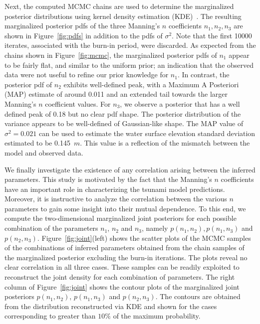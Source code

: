 Next, the computed MCMC chains are used to determine the marginalized posterior 
distributions using kernel density estimation (KDE)~\citep{Parzen1962,Silverman1986}.  
The resulting marginalized posterior pdfs of the three Manning's $n$ coefficients 
$n_1,n_2,n_3$ are shown in Figure~\ref{fig:pdfs} in addition to the pdfs of $\sigma^2$. 
Note that the first 10000 iterates, associated with the burn-in period, were discarded.  
As expected from the chains shown in Figure~\ref{fig:mcmc}, the marginalized posterior 
pdfs of $n_1$ appear to be fairly flat, and similar to the uniform prior; an indication 
that the observed data were not useful to refine our prior knowledge for $n_1$. In 
contrast, the posterior pdf of $n_2$ exhibits well-defined peak, with a Maximum A 
Posteriori (MAP) estimate of around 0.011 and an extended tail towards the larger 
Manning's $n$ coefficient values. For $n_3$, we observe a posterior that has a well 
defined peak of 0.18 but no clear pdf shape. The posterior distribution of the variance 
appears to be well-defined of Gaussian-like shape. The MAP value of $\sigma^2=0.021$ 
can be used to estimate the water surface elevation standard deviation estimated to 
be 0.145~$m$. This value is a reflection of the mismatch between the model and 
observed data.

We finally investigate the existence of any correlation arising between the inferred parameters.
This study is motivated by the fact that the Manning's $n$ coefficients have an important role 
in characterizing the tsunami model predictions. Moreover, it is instructive to analyze the 
correlation between the various $n$ parameters to gain some insight into their mutual dependence.
To this end, we compute the two-dimensional marginalized joint posteriors for each 
possible combination of the parameters $n_1$, $n_2$ and $n_3$, namely $p(n_1, n_2), p(n_1, n_3)$ and $p(n_2, n_3)$. 
Figure~\ref{fig:joint}(left) shows the scatter plots of the MCMC samples of the combinations of 
inferred parameters obtained from the chain samples of the marginalized posterior excluding 
the burn-in iterations. The plots reveal no clear correlation in all three cases. 
These samples can be readily exploited to reconstruct the joint density for each combination of parameters. 
The right column of Figure~\ref{fig:joint} shows the contour plots of the marginalized joint posteriors 
$p(n_1, n_2)$, $p(n_1, n_3)$ and $p(n_2, n_3)$. The contours are obtained from the
distribution reconstructed via KDE and shown for the cases corresponding to greater than $10\%$
of the maximum probability.

